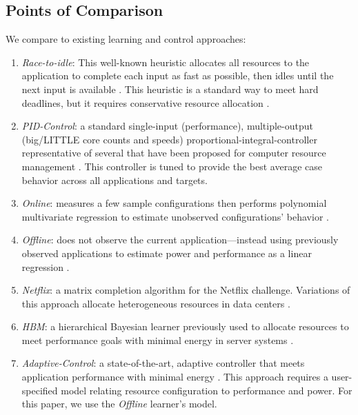 \subsection{Points of Comparison}
We compare to existing learning and control approaches:
\begin{enumerate}[leftmargin=1em]
\item \textit{Race-to-idle}: This well-known heuristic allocates all
  resources to the application to complete each input as fast as
  possible, then idles until the next input is available
  \cite{kim-cpsna,powerslope,LeSueur11}.  This heuristic is a standard
  way to meet hard deadlines, but it requires conservative resource
  allocation \cite{book}.
\item \textit{PID-Control}: a standard single-input (performance),
  multiple-output (big/LITTLE core counts and speeds)
  prop\-ortional-integral-controller representative of several that
  have been proposed for computer resource management
  \cite{Hellerstein2004a,METE}.  This controller is tuned to provide
  the best average case behavior across all applications and targets.
\item \textit{Online}: measures a few sample configurations then
  performs polynomial multivariate regression to estimate unobserved
  configurations' behavior \cite{LEO,Li2006,Ponamarev}.
\item \textit{Offline}: does not observe the current
  application---instead using previously observed applications to
  estimate power and performance as a linear regression
  \cite{PUPiL,LeeBrooks2006,CPR,reddiHPCA2013}.
\item \textit{Netflix}: a matrix completion algorithm for the
  Netflix challenge. Variations of this approach allocate
  heterogeneous resources in data centers \cite{Paragon,quasar}.
\item \textit{HBM}: a hierarchical Bayesian learner previously used
  to allocate resources to meet performance goals with minimal energy
  in server systems \cite{LEO}.
\item \textit{Adaptive-Control}: a state-of-the-art, adaptive
  controller that meets application performance with minimal energy
  \cite{POET}.  This approach requires a user-specified model relating
  resource configuration to performance and power.  For this paper, we
  use the \emph{Offline} learner's model.  
\end{enumerate}
